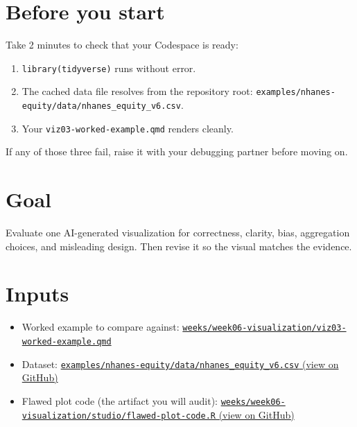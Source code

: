\documentclass[
  letterpaper,
  DIV=11,
  numbers=noendperiod,
  oneside]{scrreprt}
\providecommand{\tightlist}{%
  \setlength{\itemsep}{0pt}\setlength{\parskip}{0pt}}
\begin{document}
\section*{Before you start}\label{before-you-start}


Take 2 minutes to check that your Codespace is ready:

\begin{enumerate}
\def\labelenumi{\arabic{enumi}.}
\tightlist
\item
  \texttt{library(tidyverse)} runs without error.
\item
  The cached data file resolves from the repository root:
  \texttt{examples/nhanes-equity/data/nhanes\_equity\_v6.csv}.
\item
  Your \texttt{viz03-worked-example.qmd} renders cleanly.
\end{enumerate}

If any of those three fail, raise it with your debugging partner before
moving on.

\section*{Goal}\label{goal-3}


Evaluate one AI-generated visualization for correctness, clarity, bias,
aggregation choices, and misleading design. Then revise it so the visual
matches the evidence.

\section*{Inputs}\label{inputs}


\begin{itemize}
\tightlist
\item
  Worked example to compare against:
  \hyperref[worked-example-descriptive-bmi-visualization]{\texttt{weeks/week06-visualization/viz03-worked-example.qmd}}
\item
  Dataset:
  \href{https://github.com/ehsanx/HDSx/blob/main/examples/nhanes-equity/data/nhanes_equity_v6.csv}{\texttt{examples/nhanes-equity/data/nhanes\_equity\_v6.csv}
  (view on GitHub)}
\item
  Flawed plot code (the artifact you will audit):
  \href{https://github.com/ehsanx/HDSx/blob/main/weeks/week06-visualization/studio/flawed-plot-code.R}{\texttt{weeks/week06-visualization/studio/flawed-plot-code.R}
  (view on GitHub)}
\end{itemize}
\end{document}
